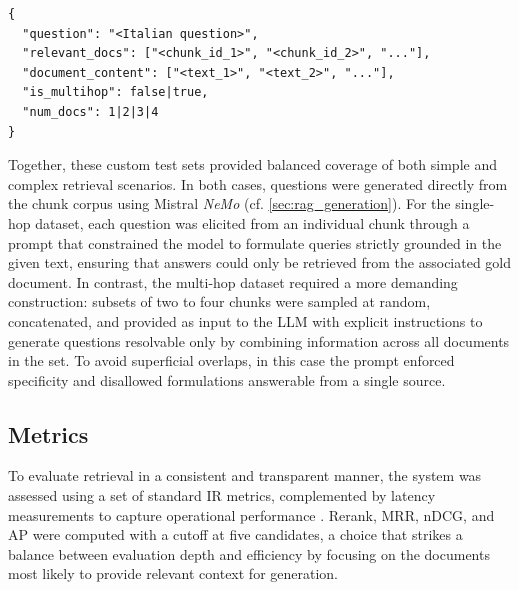 \begin{spacing}{1.5}
\vspace{0.6em}

\begin{lstlisting}[frame=none,
                   caption={JSON output format for combined dataset items, including single-hop and multi-hop questions.},
                   captionpos=b,
                   label={lst:combined-set-example},
  xleftmargin=0.2\textwidth,
  xrightmargin=0.2\textwidth,
  basicstyle=\fontsize{9}{10.5}\selectfont\ttfamily]
{
  "question": "<Italian question>",
  "relevant_docs": ["<chunk_id_1>", "<chunk_id_2>", "..."],
  "document_content": ["<text_1>", "<text_2>", "..."],
  "is_multihop": false|true,
  "num_docs": 1|2|3|4
}
\end{lstlisting}
\vspace{0.6em}

Together, these custom test sets provided balanced coverage of both simple and complex retrieval scenarios. In both cases, questions were generated directly from the chunk corpus using Mistral \textit{NeMo} (cf. \autoref{sec:rag_generation}). For the single-hop dataset, each question was elicited from an individual chunk through a prompt that constrained the model to formulate queries strictly grounded in the given text, ensuring that answers could only be retrieved from the associated gold document. In contrast, the multi-hop dataset required a more demanding construction: subsets of two to four chunks were sampled at random, concatenated, and provided as input to the LLM with explicit instructions to generate questions resolvable only by combining information across all documents in the set. To avoid superficial overlaps, in this case the prompt enforced specificity and disallowed formulations answerable from a single source.


\subsection{Metrics}\label{sec:metrics}
To evaluate retrieval in a consistent and transparent manner, the system was assessed using a set of standard IR metrics, complemented by latency measurements to capture operational performance \citep{wang_searching_2024}.
Rerank, MRR, nDCG, and AP were computed with a cutoff at five candidates, a choice that strikes a balance between evaluation depth and efficiency by focusing on the documents most likely to provide relevant context for generation.


\end{spacing}
